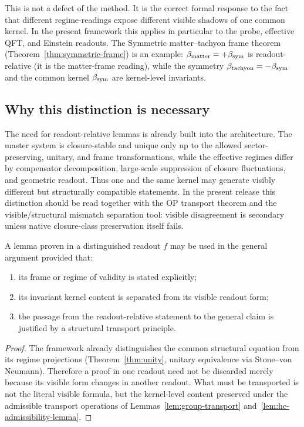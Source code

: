 \begin{remark}
This is not a defect of the method. It is the correct formal response to
the fact that different regime-readings expose different visible shadows
of one common kernel. In the present framework this applies in particular
to the probe, effective QFT, and Einstein readouts.
The Symmetric matter--tachyon frame theorem (Theorem~\ref{thm:symmetric-frame})
is an example: $\beta_{\mathrm{matter}} = +\beta_{\mathrm{sym}}$ is readout-relative
(it is the matter-frame reading), while the symmetry
$\beta_{\mathrm{tachyon}} = -\beta_{\mathrm{sym}}$ and the common kernel $\beta_{\mathrm{sym}}$ are
kernel-level invariants.
\end{remark}

\subsection*{Why this distinction is necessary}

The need for readout-relative lemmas is already built into the
architecture. The master system is closure-stable and unique only up to
the allowed sector-preserving, unitary, and frame transformations, while
the effective regimes differ by compensator decomposition, large-scale
suppression of closure fluctuations, and geometric readout. Thus one and
the same kernel may generate visibly different but structurally
compatible statements. In the present release this distinction should be read together with the OP transport theorem and the visible/structural mismatch separation tool: visible disagreement is secondary unless native closure-class preservation itself fails.

\begin{proposition}
\label{prop:legitimacy-restricted-lemmas}
A lemma proven in a distinguished readout $f$ may be used in the general
argument provided that:
\begin{enumerate}[label=(\roman*)]
  \item its frame or regime of validity is stated explicitly;
  \item its invariant kernel content is separated from its visible
        readout form;
  \item the passage from the readout-relative statement to the general
        claim is justified by a structural transport principle.
\end{enumerate}
\end{proposition}

\begin{proof}
The framework already distinguishes the common structural equation from
its regime projections (Theorem~\ref{thm:unity}, unitary equivalence via
Stone--von Neumann). Therefore a proof in one readout need not be
discarded merely because its visible form changes in another readout.
What must be transported is not the literal visible formula, but the
kernel-level content preserved under the admissible transport operations
of Lemmas~\ref{lem:group-transport} and~\ref{lem:hc-admissibility-lemma}.
\end{proof}

